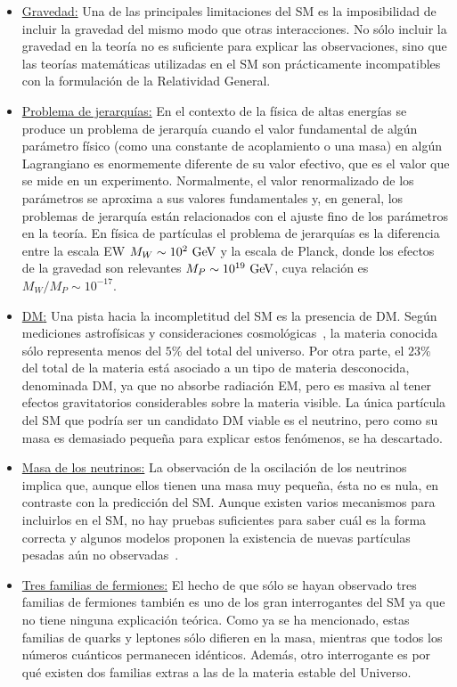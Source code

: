\begin{itemize}
    \item \underline{Gravedad:} Una de las principales limitaciones del \ac{SM} es la imposibilidad de incluir la gravedad del mismo modo que otras interacciones. No sólo incluir la gravedad en la teoría no es suficiente para explicar las observaciones, sino que las teorías matemáticas utilizadas en el \ac{SM} son prácticamente incompatibles con la formulación de la Relatividad General.
    \item \underline{Problema de jerarquías:} En el contexto de la física de altas energías se produce un problema de jerarquía cuando el valor fundamental de algún parámetro físico (como una constante de acoplamiento o una masa) en algún Lagrangiano es enormemente diferente de su valor efectivo, que es el valor que se mide en un experimento. Normalmente, el valor renormalizado de los parámetros se aproxima a sus valores fundamentales y, en general, los problemas de jerarquía están relacionados con el ajuste fino de los parámetros en la teoría. En física de partículas el problema de jerarquías es la diferencia entre la escala \ac{EW} \(M_W \sim 10^2~\text{GeV}\) y la escala de Planck, donde los efectos de la gravedad son relevantes \(M_P\sim10^{19}~\text{GeV}\), cuya relación es \(M_W / M_P \sim 10^{-17}\).
    \item \underline{\acf{DM}:} Una pista hacia la incompletitud del \ac{SM} es la presencia de \ac{DM}. Según mediciones astrofísicas y consideraciones cosmológicas~\cite{Zwicky-1937,Rubin_Kent-1970,Planck-2014,Clowe-2006,Brada-2008}, la materia conocida sólo representa menos del \(5\%\) del total del universo. Por otra parte, el \(23\%\) del total de la materia está asociado a un tipo de materia desconocida, denominada \ac{DM}, ya que no absorbe radiación \ac{EM}, pero es masiva al tener efectos gravitatorios considerables sobre la materia visible. La única partícula del \ac{SM} que podría ser un candidato \ac{DM} viable es el neutrino, pero como su masa es demasiado pequeña para explicar estos fenómenos, se ha descartado.
    \item \underline{Masa de los neutrinos:} La observación de la oscilación de los neutrinos implica que, aunque ellos tienen una masa muy pequeña, ésta no es nula, en contraste con la predicción del \ac{SM}. Aunque existen varios mecanismos para incluirlos en el \ac{SM}, no hay pruebas suficientes para saber cuál es la forma correcta y algunos modelos proponen la existencia de nuevas partículas pesadas aún no observadas~\cite{GellMann_Ramond_Slansky-2010,Glashow-1980,Ramond-2005}.
    \item \underline{Tres familias de fermiones:} El hecho de que sólo se hayan observado tres familias de fermiones también es uno de los gran interrogantes del \ac{SM} ya que no tiene ninguna explicación teórica. Como ya se ha mencionado, estas familias de quarks y leptones sólo difieren en la masa, mientras que todos los números cuánticos permanecen idénticos. Además, otro interrogante es por qué existen dos familias extras a las de la materia estable del Universo.
\end{itemize}





